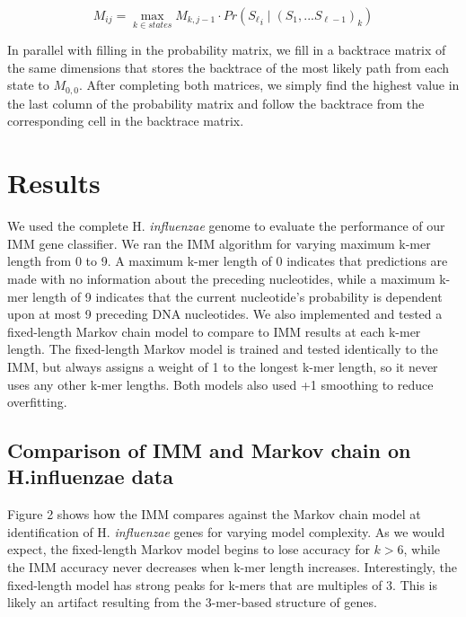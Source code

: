 \documentclass[11pt,letterpaper]{article}
\begin{document}
$$M_{ij} = \max_{k \in states} M_{k,j-1} \cdot Pr\left({S_\ell}_i \mid \left( S_1,...S_{\ell-1}  \right)_k \right)$$

 In parallel with filling in the probability matrix, we fill in a backtrace matrix of the same dimensions that stores the backtrace of the most likely path from each state to $M_{0,0}$. After completing both matrices, we simply find the highest value in the last column of the probability matrix and follow the backtrace from the corresponding cell in the backtrace matrix.



\section{Results}

We used the complete H. \emph{influenzae} genome to evaluate the performance of our IMM gene classifier. We ran the IMM algorithm for varying maximum k-mer length from 0 to 9. A maximum k-mer length of 0 indicates that predictions are made with no information about the preceding nucleotides, while a maximum k-mer length of 9 indicates that the current nucleotide’s probability is dependent upon at most 9 preceding DNA nucleotides. We also implemented and tested a fixed-length Markov chain model to compare to IMM results at each k-mer length. The fixed-length Markov model is trained and tested identically to the IMM, but always assigns a weight of 1 to the longest k-mer length, so it never uses any other k-mer lengths. Both models also used +1 smoothing to reduce overfitting.

\subsection{Comparison of IMM and Markov chain on H.influenzae data}
Figure 2 shows how the IMM compares against the Markov chain model at identification of H. \emph{influenzae} genes for varying model complexity. As we would expect, the fixed-length Markov model begins to lose accuracy for $k>6$, while the IMM accuracy never decreases when k-mer length increases. Interestingly, the fixed-length model has strong peaks for k-mers that are multiples of 3. This is likely an artifact resulting from the 3-mer-based structure of genes.
\end{document}

